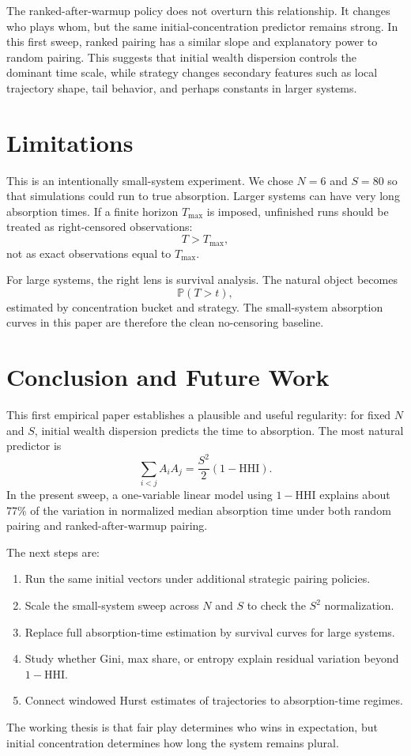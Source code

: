 \documentclass[10pt]{article}
\begin{document}
The ranked-after-warmup policy does not overturn this relationship. It changes who plays whom, but the same initial-concentration predictor remains strong. In this first sweep, ranked pairing has a similar slope and explanatory power to random pairing. This suggests that initial wealth dispersion controls the dominant time scale, while strategy changes secondary features such as local trajectory shape, tail behavior, and perhaps constants in larger systems.

\section{Limitations}

This is an intentionally small-system experiment. We chose $N=6$ and $S=80$ so that simulations could run to true absorption. Larger systems can have very long absorption times. If a finite horizon $T_{\max}$ is imposed, unfinished runs should be treated as right-censored observations:
\[
  T > T_{\max},
\]
not as exact observations equal to $T_{\max}$.

For large systems, the right lens is survival analysis. The natural object becomes
\[
  \mathbb{P}(T>t),
\]
estimated by concentration bucket and strategy. The small-system absorption curves in this paper are therefore the clean no-censoring baseline.

\section{Conclusion and Future Work}

This first empirical paper establishes a plausible and useful regularity: for fixed $N$ and $S$, initial wealth dispersion predicts the time to absorption. The most natural predictor is
\[
  \sum_{i<j} A_iA_j
  =
  \frac{S^2}{2}(1-\mathrm{HHI}).
\]
In the present sweep, a one-variable linear model using $1-\mathrm{HHI}$ explains about 77\% of the variation in normalized median absorption time under both random pairing and ranked-after-warmup pairing.

The next steps are:
\begin{enumerate}
  \item Run the same initial vectors under additional strategic pairing policies.
  \item Scale the small-system sweep across $N$ and $S$ to check the $S^2$ normalization.
  \item Replace full absorption-time estimation by survival curves for large systems.
  \item Study whether Gini, max share, or entropy explain residual variation beyond $1-\mathrm{HHI}$.
  \item Connect windowed Hurst estimates of trajectories to absorption-time regimes.
\end{enumerate}

The working thesis is that fair play determines who wins in expectation, but initial concentration determines how long the system remains plural.
\end{document}
